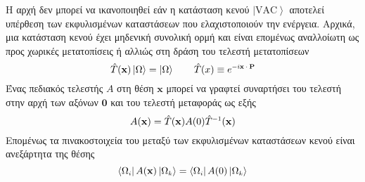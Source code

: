Η αρχή δεν μπορεί να ικανοποιηθεί εάν
η κατάσταση κενού $\left|\text{VAC}\right>$ αποτελεί υπέρθεση 
των εκφυλισμένων καταστάσεων που ελαχιστοποιούν την ενέργεια. Αρχικά, μια κατάσταση κενού έχει μηδενική συνολική ορμή 
και είναι επομένως αναλλοίωτη ως προς χωρικές μετατοπίσεις ή αλλιώς στη δράση του τελεστή μετατοπίσεων 
\begin{equation}\label{vacuum spatial transl invariance}
    \hat{T}(\mathbf{x})\left|\Omega\right>=\left|\Omega\right> \qquad \hat{T}(x)\equiv e\superscr{-i\mathbf{x}\cdot\mathbf{P}}
\end{equation}
Ένας πεδιακός τελεστής $A$ στη θέση $\mathbf{x}$ μπορεί να γραφτεί συναρτήσει του τελεστή στην αρχή των αξόνων $\mathbf{0}$ και του τελεστή μεταφοράς ως εξής
\begin{equation}\label{operator spatial translation}
    A(\mathbf{x})=\hat{T}(\mathbf{x})A(0)\hat{T}\superscr{-1}(\mathbf{x})
\end{equation}
Επομένως τα πινακοστοιχεία του μεταξύ των εκφυλισμένων καταστάσεων κενού είναι ανεξάρτητα της θέσης 
\begin{equation}
    \left<\Omega\subscr{i}\right|A(\mathbf{x})\left|\Omega\subscr{k}\right>=\left<\Omega\subscr{i}\right|A(0)\left|\Omega\subscr{k}\right>
\end{equation}
\\

